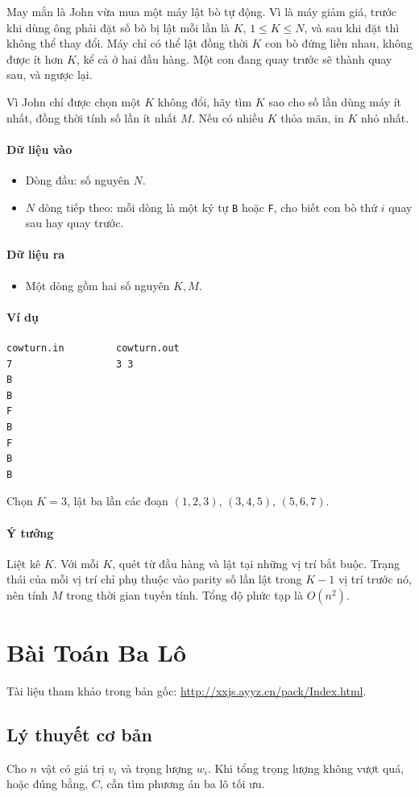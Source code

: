 \documentclass[11pt]{article}
\newcommand{\iosec}[1]{\paragraph{#1}}
\newcommand{\bigO}[1]{\ensuremath{O(#1)}}
\begin{document}
May mắn là John vừa mua một máy lật bò tự động. Vì là máy giảm giá, trước khi dùng ông phải đặt số bò bị lật mỗi lần là \(K\), \(1 \le K \le N\), và sau khi đặt thì không thể thay đổi. Máy chỉ có thể lật đồng thời \(K\) con bò đứng liền nhau, không được ít hơn \(K\), kể cả ở hai đầu hàng. Một con đang quay trước sẽ thành quay sau, và ngược lại.

Vì John chỉ được chọn một \(K\) không đổi, hãy tìm \(K\) sao cho số lần dùng máy ít nhất, đồng thời tính số lần ít nhất \(M\). Nếu có nhiều \(K\) thỏa mãn, in \(K\) nhỏ nhất.

\iosec{Dữ liệu vào}
\begin{itemize}
  \item Dòng đầu: số nguyên \(N\).
  \item \(N\) dòng tiếp theo: mỗi dòng là một ký tự \texttt{B} hoặc \texttt{F}, cho biết con bò thứ \(i\) quay sau hay quay trước.
\end{itemize}

\iosec{Dữ liệu ra}
\begin{itemize}
  \item Một dòng gồm hai số nguyên \(K,M\).
\end{itemize}

\iosec{Ví dụ}
\begin{verbatim}
cowturn.in         cowturn.out
7                  3 3
B
B
F
B
F
B
B
\end{verbatim}

Chọn \(K=3\), lật ba lần các đoạn \((1,2,3)\), \((3,4,5)\), \((5,6,7)\).

\iosec{Ý tưởng}
Liệt kê \(K\). Với mỗi \(K\), quét từ đầu hàng và lật tại những vị trí bắt buộc. Trạng thái của mỗi vị trí chỉ phụ thuộc vào parity số lần lật trong \(K-1\) vị trí trước nó, nên tính \(M\) trong thời gian tuyến tính. Tổng độ phức tạp là \(\bigO{n^2}\).

\section{Bài Toán Ba Lô}

Tài liệu tham khảo trong bản gốc: \url{http://xxjs.ayyz.cn/pack/Index.html}.

\subsection{Lý thuyết cơ bản}

Cho \(n\) vật có giá trị \(v_i\) và trọng lượng \(w_i\). Khi tổng trọng lượng không vượt quá, hoặc đúng bằng, \(C\), cần tìm phương án ba lô tối ưu.
\end{document}
